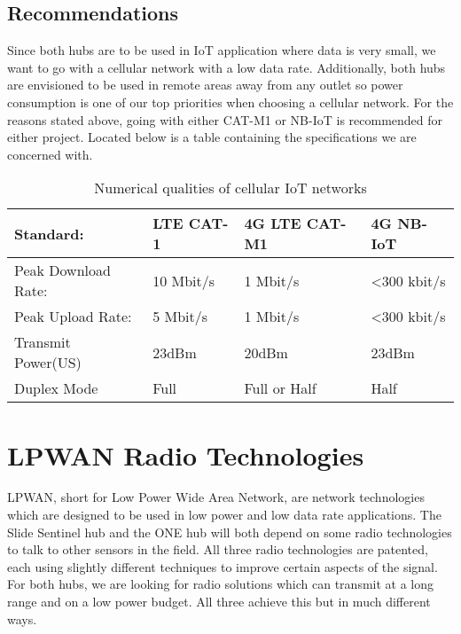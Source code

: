 \documentclass[draftclsnofoot,onecolumn, 10pt, compsoc]{IEEEtran}
\begin{document}
	\subsection{Recommendations}
	Since both hubs are to be used in IoT application where data is very small, we want to go with a cellular network with a low data rate. Additionally, both hubs are envisioned to be used in remote areas away from any outlet so power consumption is one of our top priorities when choosing a cellular network. For the reasons stated above, going with either CAT-M1 or NB-IoT is recommended for either project. Located below is a table containing the specifications we are concerned with.

	\begin{table}[h]
		\centering
		\large
		\caption{Numerical qualities of cellular IoT networks}
		\begin{tabular}{|l|l|l|l|}
			\hline
			Standard:           & LTE CAT-1 & 4G LTE CAT-M1 & 4G NB-IoT            \\ \hline
			Peak Download Rate: & 10 Mbit/s & 1 Mbit/s      & \textless 300 kbit/s \\ \hline
			Peak Upload Rate:   & 5  Mbit/s & 1 Mbit/s      & \textless 300 kbit/s \\ \hline
			Transmit Power(US)  & 23dBm     & 20dBm         & 23dBm                \\ \hline
			Duplex Mode         & Full      & Full or Half  & Half                 \\ \hline
		\end{tabular}

	\end{table}
	

	\section{LPWAN Radio Technologies}
	LPWAN, short for Low Power Wide Area Network, are network technologies which are designed to be used in low power and low data rate applications. The Slide Sentinel hub and the ONE hub will both depend on some radio technologies to talk to other sensors in the field. All three radio technologies are patented, each using slightly different techniques to improve certain aspects of the signal. For both hubs, we are looking for radio solutions which can transmit at a long range and on a low power budget. All three achieve this but in much different ways.
	
\end{document}
